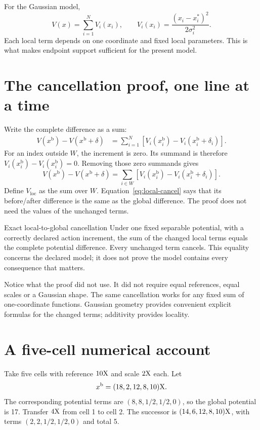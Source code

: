 For the Gaussian model,
\[
 V(x)=\sum_{i=1}^{N}V_i(x_i),\qquad
 V_i(x_i)=\frac{(x_i-x_i^*)^2}{2\sigma_i^2}.
\]
Each local term depends on one coordinate and fixed local parameters. This is what makes endpoint support sufficient for the present model.

\section{The cancellation proof, one line at a time}
Write the complete difference as a sum:
\begin{align}
 V(x^{\mathrm{b}})-V(x^{\mathrm{b}}+\delta)
 &=\sum_{i=1}^{N}\left[V_i(x^{\mathrm{b}}_i)-V_i(x^{\mathrm{b}}_i+\delta_i)\right].
\end{align}
For an index outside $W$, the increment is zero. Its summand is therefore $V_i(x^{\mathrm{b}}_i)-V_i(x^{\mathrm{b}}_i)=0$. Removing those zero summands gives
\begin{equation}\label{eq:local-cancel}
 V(x^{\mathrm{b}})-V(x^{\mathrm{b}}+\delta)
 =\sum_{i\in W}\left[V_i(x^{\mathrm{b}}_i)-V_i(x^{\mathrm{b}}_i+\delta_i)\right].
\end{equation}
Define $V_{\mathrm{loc}}$ as the sum over $W$. Equation~\eqref{eq:local-cancel} says that its before/after difference is the same as the global difference. The proof does not need the values of the unchanged terms.

\begin{lawbox}{Exact local-to-global cancellation}
Under one fixed separable potential, with a correctly declared action increment, the sum of the changed local terms equals the complete potential difference. Every unchanged term cancels. This equality concerns the declared model; it does not prove the model contains every consequence that matters.
\end{lawbox}

Notice what the proof did not use. It did not require equal references, equal scales or a Gaussian shape. The same cancellation works for any fixed sum of one-coordinate functions. Gaussian geometry provides convenient explicit formulas for the changed terms; additivity provides locality.

\section{A five-cell numerical account}
Take five cells with reference $10\mathrm{X}$ and scale $2\mathrm{X}$ each. Let
\[
 x^{\mathrm{b}}=(18,2,12,8,10)\mathrm{X}.
\]
The corresponding potential terms are $(8,8,1/2,1/2,0)$, so the global potential is 17. Transfer $4\mathrm{X}$ from cell 1 to cell 2. The successor is $(14,6,12,8,10)\mathrm{X}$, with terms $(2,2,1/2,1/2,0)$ and total 5.

